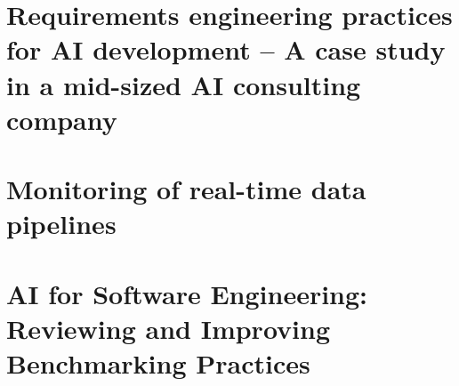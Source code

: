 \documentclass{article}
\begin{document}



\newpage
\section{Requirements engineering practices for AI development – A case study in a mid-sized AI consulting company}


\newpage
\section{Monitoring of real-time data pipelines}


\newpage
\section{AI for Software Engineering: Reviewing and Improving Benchmarking Practices}

\end{document}
